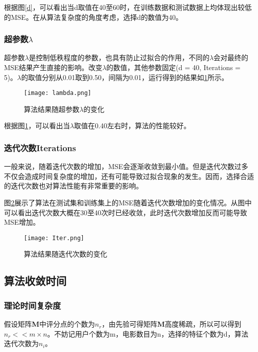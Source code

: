 \documentclass[11pt]{article}
\begin{document}
根据图\ref{d}，可以看出当d取值在40至60时，在训练数据和测试数据上均体现出较低的MSE。在从算法复杂度的角度考虑，选择d的数值为40。

\subsubsection{超参数$\lambda$}

超参数$\lambda$是控制低秩程度的参数，也具有防止过拟合的作用，不同的$\lambda$会对最终的MSE结果产生直接的影响。改变$\lambda$的数值，其他参数固定(d = 40, Iterations = 5)。$\lambda$的取值分别从0.01取到0.50，间隔为0.01，运行得到的结果如\ref{lambda}所示。

\begin{figure}[!htbp]
    \centering
    \texttt{[image: lambda.png]}
    \caption{算法结果随超参数$\lambda$的变化}
    \label{lambda}
\end{figure}

根据图\ref{lambda}，可以看出当$\lambda$取值在0.40左右时，算法的性能较好。

\subsubsection{迭代次数Iterations}

一般来说，随着迭代次数的增加，MSE会逐渐收敛到最小值。但是迭代次数过多不仅会造成时间复杂度的增加，还有可能导致过拟合现象的发生。因而，选择合适的迭代次数也对算法性能有非常重要的影响。

图\ref{Iter}展示了算法在测试集和训练集上的MSE随着迭代次数增加的变化情况。从图中可以看出迭代次数大概在30至40次时已经收敛，此时迭代次数增加反而可能导致MSE增加。

\begin{figure}[!htbp]
    \centering
    \texttt{[image: Iter.png]}
    \caption{算法结果随迭代次数的变化}
    \label{Iter}
\end{figure}

\subsection{算法收敛时间}
\subsubsection{理论时间复杂度}

假设矩阵\textbf{M}中评分点的个数为$n_r$，由先验可得矩阵\textbf{M}高度稀疏，所以可以得到$n_r << m\times n$。不妨记用户个数为m，电影数目为n，选择的特征个数为d，算法迭代次数为$n_i$。
\end{document}
